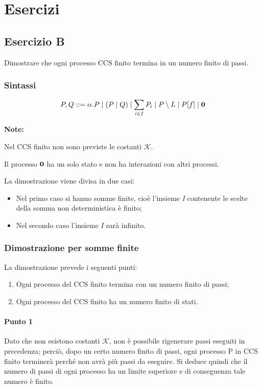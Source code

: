 \section{Esercizi}
\subsection{Esercizio B} 
Dimostrare che ogni processo CCS finito termina in un numero finito di passi.

\subsubsection{Sintassi}

\[
	P, Q ::=
	\alpha.P\mid
	(P\mid Q)\mid
	\sum_{i\in I} P_i\mid
	P\setminus L\mid
	P[f]\mid
	\mathbf{0}
\] 

\textbf{Note:}

Nel CCS finito non sono previste le costanti $\mathcal{K}$.
 
Il processo \(\mathbf{0}\) ha un solo stato e non ha interazioni con altri processi.

La dimostrazione viene divisa in due casi: 
\begin{itemize}
	\item Nel primo caso si hanno somme finite, cioè l'insieme \textit{I} contenente le scelte della somma non deterministica è finito;
	\item Nel secondo caso l'insieme \(I\) sarà infinito.
\end{itemize} 
\subsubsection{Dimostrazione per somme finite}

La dimostrazione prevede i seguenti punti:
\begin{enumerate}
	\item Ogni processo del CCS finito termina con un numero finito di passi;
	\item Ogni processo del CCS finito ha un numero finito di stati.
\end{enumerate}

\paragraph{Punto 1} \mbox{}

Dato che non esistono costanti $\mathcal{K}$, non è possibile rigenerare passi eseguiti in precedenza; perciò, dopo un certo numero finito di passi, ogni processo P in CCS finito terminerà perché non avrà più passi da eseguire. Si deduce quindi che il numero di passi di ogni processo ha un limite superiore e di conseguenza tale numero è finito.

